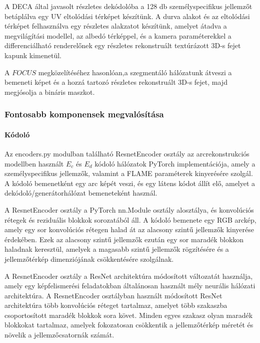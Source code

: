 \documentclass[12pt,a4]{article}
\begin{document}
            A DECA által javasolt részletes dekódolóba a 128 db személyspecifikus jellemzőt betáplálva egy UV eltolódási térképet készítünk. A durva alakot és az eltolódási térképet felhasználva egy részletes alakzatot készítünk, amelyet átadva a megvilágítási modellel,
        	az albedó térképpel, és a kamera paraméterekkel a differenciálható renderelőnek egy részletes rekonstruált textúrázott 3D-s fejet kapunk kimenetül.

 
        	A $FOCUS$ megközelítéséhez hasonlóan,a szegmentáló hálózatunk átveszi
        	a bemeneti képet és a hozzá tartozó részletes rekonstruált 3D-s fejet, majd
        	megjósolja a bináris maszkot.

         \subsubsection{Fontosabb komponensek megvalósítása}
         \paragraph{Kódoló}

            Az encoders.py modulban található ResnetEncoder osztály az arcrekonstrukciós modellben használt $E_c$ és $E_d$ kódoló  hálózatok PyTorch implementációja, amely a személyspecifikus jellemzők, valamint a FLAME paraméterek kinyerésére szolgál. 
            A kódoló bemenetként egy arc képét veszi, és egy látens kódot állít elő, amelyet a dekódoló/generátorhálózat bemeneteként használ.
            
            A ResnetEncoder osztály a PyTorch nn.Module osztály alosztálya, és konvolúciós rétegek és reziduális blokkok sorozatából áll.
            A kódoló bemenete egy RGB arckép, amely egy sor konvolúciós rétegen halad át az alacsony szintű jellemzők kinyerése érdekében.
            Ezek az alacsony szintű jellemzők ezután egy sor maradék blokkon haladnak keresztül, amelyek a magasabb szintű jellemzők rögzítésére és a jellemzőtérkép dimenziójának csökkentésére szolgálnak.
            
            A ResnetEncoder osztály a ResNet architektúra módosított változatát használja, amely egy képfelismerési feladatokban általánosan használt mély neurális hálózati architektúra.
            A ResnetEncoder osztályban használt módosított ResNet architektúra több konvolúciós réteget tartalmaz, amelyet több szakaszba csoportosított maradék blokkok sora követ.
            Minden egyes szakasz olyan maradék blokkokat tartalmaz, amelyek fokozatosan csökkentik a jellemzőtérkép méretét és növelik a jellemzőcsatornák számát.
            
\end{document}
